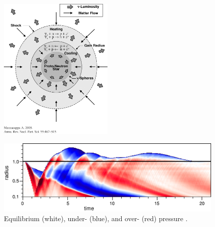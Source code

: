 \documentclass{beamer}
\begin{document}
\begin{frame}

  \begin{figure}[htb!]
    \centering
    \includegraphics[width=0.5\textwidth]{fig.pns.jpeg}
  \end{figure}

\end{frame}

\begin{frame}

  \begin{figure}[htb!]
    \centering
    \includegraphics[width=\textwidth]{fig.pressure.jpg}
    \caption{Equilibrium (white), under- (blue), and over- (red) pressure
             \citep{bmd2003}.}
  \end{figure}

\end{frame}
\end{document}
